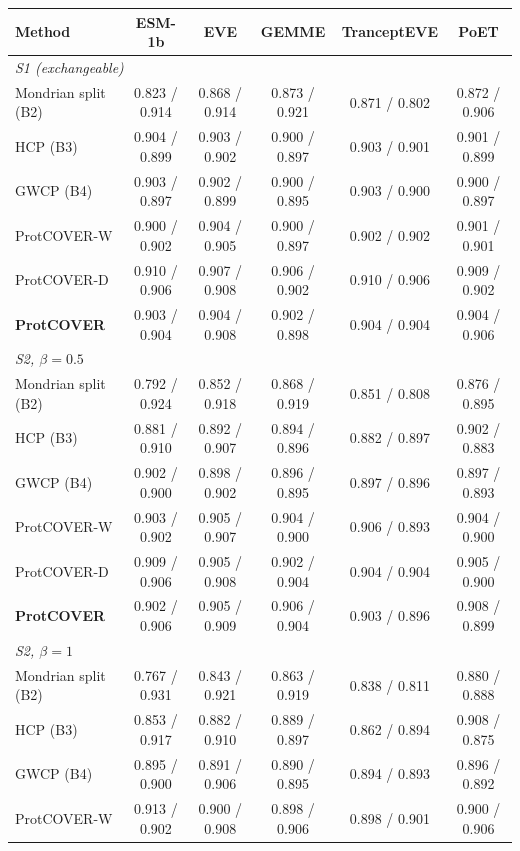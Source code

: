\begin{tabular}{lccccc}
\toprule
Method & ESM-1b & EVE & GEMME & TranceptEVE & PoET \\
\midrule
\multicolumn{6}{l}{\emph{S1 (exchangeable)}} \\
Mondrian split (B2) & 0.823 / 0.914 & 0.868 / 0.914 & 0.873 / 0.921 & 0.871 / 0.802 & 0.872 / 0.906 \\
HCP (B3) & 0.904 / 0.899 & 0.903 / 0.902 & 0.900 / 0.897 & 0.903 / 0.901 & 0.901 / 0.899 \\
GWCP (B4) & 0.903 / 0.897 & 0.902 / 0.899 & 0.900 / 0.895 & 0.903 / 0.900 & 0.900 / 0.897 \\
ProtCOVER-W & 0.900 / 0.902 & 0.904 / 0.905 & 0.900 / 0.897 & 0.902 / 0.902 & 0.901 / 0.901 \\
ProtCOVER-D & 0.910 / 0.906 & 0.907 / 0.908 & 0.906 / 0.902 & 0.910 / 0.906 & 0.909 / 0.902 \\
\textbf{ProtCOVER} & 0.903 / 0.904 & 0.904 / 0.908 & 0.902 / 0.898 & 0.904 / 0.904 & 0.904 / 0.906 \\
\midrule
\multicolumn{6}{l}{\emph{S2, $\beta=0.5$}} \\
Mondrian split (B2) & 0.792 / 0.924 & 0.852 / 0.918 & 0.868 / 0.919 & 0.851 / 0.808 & 0.876 / 0.895 \\
HCP (B3) & 0.881 / 0.910 & 0.892 / 0.907 & 0.894 / 0.896 & 0.882 / 0.897 & 0.902 / 0.883 \\
GWCP (B4) & 0.902 / 0.900 & 0.898 / 0.902 & 0.896 / 0.895 & 0.897 / 0.896 & 0.897 / 0.893 \\
ProtCOVER-W & 0.903 / 0.902 & 0.905 / 0.907 & 0.904 / 0.900 & 0.906 / 0.893 & 0.904 / 0.900 \\
ProtCOVER-D & 0.909 / 0.906 & 0.905 / 0.908 & 0.902 / 0.904 & 0.904 / 0.904 & 0.905 / 0.900 \\
\textbf{ProtCOVER} & 0.902 / 0.906 & 0.905 / 0.909 & 0.906 / 0.904 & 0.903 / 0.896 & 0.908 / 0.899 \\
\midrule
\multicolumn{6}{l}{\emph{S2, $\beta=1$}} \\
Mondrian split (B2) & 0.767 / 0.931 & 0.843 / 0.921 & 0.863 / 0.919 & 0.838 / 0.811 & 0.880 / 0.888 \\
HCP (B3) & 0.853 / 0.917 & 0.882 / 0.910 & 0.889 / 0.897 & 0.862 / 0.894 & 0.908 / 0.875 \\
GWCP (B4) & 0.895 / 0.900 & 0.891 / 0.906 & 0.890 / 0.895 & 0.894 / 0.893 & 0.896 / 0.892 \\
ProtCOVER-W & 0.913 / 0.902 & 0.900 / 0.908 & 0.898 / 0.906 & 0.898 / 0.901 & 0.900 / 0.906 \\

\end{tabular}
